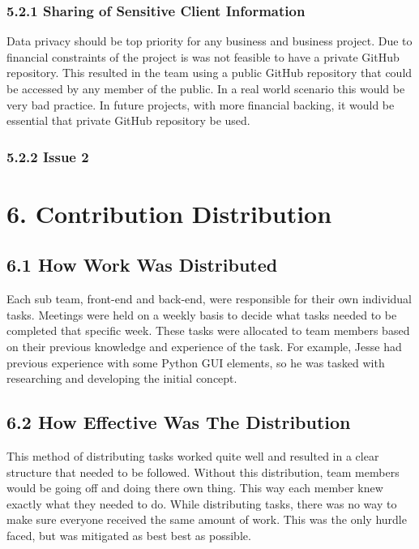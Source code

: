 \documentclass[11pt]{article}
\begin{document}
\begin{adjustwidth}{1cm}{}

\subsubsection{5.2.1 Sharing of Sensitive Client Information}
Data privacy should be top priority for any business and business project. Due to financial constraints of the project is was not feasible to have a private GitHub repository. This resulted in the team using a public GitHub repository that could be accessed by any member of the public. In a real world scenario this would be very bad practice. In future projects, with more financial backing, it would be essential that private GitHub repository be used.

\subsubsection{5.2.2 Issue 2}



\end{adjustwidth}


\section{6. Contribution Distribution}

\subsection{6.1 How Work Was Distributed}
Each sub team, front-end and back-end, were responsible for their own individual tasks. Meetings were held on a weekly basis to decide what tasks needed to be completed that specific week. These tasks were allocated to team members based on their previous knowledge and experience of the task. For example, Jesse had previous experience with some Python GUI elements, so he was tasked with researching and developing the initial concept.


\subsection{6.2 How Effective Was The Distribution}
This method of distributing tasks worked quite well and resulted in a clear structure that needed to be followed. Without this distribution, team members would be going off and doing there own thing. This way each member knew exactly what they needed to do. While distributing tasks, there was no way to make sure everyone received the same amount of work. This was the only hurdle faced, but was mitigated as best best as possible.
\end{document}
